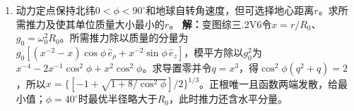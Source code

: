 \documentclass[UTF8,fontset=fandol,a4paper,11pt]{ctexart}
\begin{document}
\begin{enumerate}
\item 动力定点保持北纬$0<\phi<90^\circ$和地球自转角速度，但可选择地心距离$r$。求所需推力及使其单位质量大小最小的$r$。
\textbf{解：}变图综三.2V6令$x=r/R_0$、$g_0=\omega_0^2R_0$。所需推力除以质量的分量为$g_0[(x^{-2}-x)\cos\phi\,\hat e_\rho+x^{-2}\sin\phi\,\hat e_z]$，模平方除以$g_0^2$为$x^{-4}-2x^{-1}\cos^2\phi+x^2\cos^2\phi$。求导置零并令$q=x^3$，得$\cos^2\phi(q^2+q)=2$，所以$x=\{[-1+\sqrt{1+8/\cos^2\phi}]/2\}^{1/3}$。正根唯一且函数两端发散，给最小值；$\phi=40^\circ$时最优半径略大于$R_0$，此时推力还含水平分量。
\begin{center}\begin{minipage}{.98\linewidth}\centering
{}
\end{minipage}
\end{center}
\end{enumerate}
\end{document}
